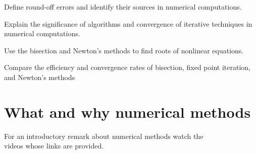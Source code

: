 

\begin{mlos}
\item Define round-off errors and identify their sources in numerical computations.
\item Explain the significance of algorithms and convergence of iterative techniques in numerical computations.
  \item Use the bisection and Newton’s methods to find roots of nonlinear equations.
  \item Compare the efficiency and convergence rates of bisection, fixed point iteration, and Newton’s methods
\end{mlos}

\section*{What and why numerical methods}
\begin{youtube}[]
For an introductory remark about numerical methods watch the \\videos whose links are provided.


\end{youtube}

%

